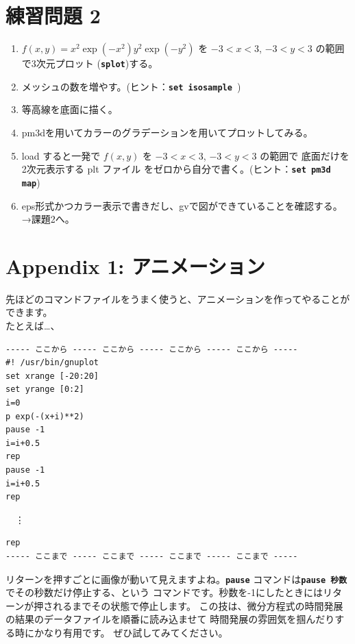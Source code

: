 \documentclass[a4j]{ujarticle} %
\begin{document}
\section{練習問題 2}
\begin{enumerate}
\item
     $f(x,y) = x^2 \exp \left(-x^2\right) y^2 \exp \left(-y^2\right)$
     を $-3<x<3$, $-3<y<3$
     の範囲で3次元プロット ({\tt\bf splot})する。
\item
     メッシュの数を増やす。(ヒント：{\tt\bf set isosample })
\item
     等高線を底面に描く。
\item
     pm3dを用いてカラーのグラデーションを用いてプロットしてみる。
\item
     load すると一発で $f(x,y)$
     を $-3<x<3$, $-3<y<3$ の範囲で
     底面だけを2次元表示する plt ファイル
     をゼロから自分で書く。(ヒント：{\tt\bf set pm3d map})
\item
     eps形式かつカラー表示で書きだし、gvで図ができていることを確認する。\\
     →課題2へ。
\end{enumerate}

\newpage
\section*{Appendix 1:  アニメーション}
先ほどのコマンドファイルをうまく使うと、アニメーションを作ってやることが
できます。\\
たとえば…、
\begin{verbatim}
----- ここから ----- ここから ----- ここから ----- ここから -----
#! /usr/bin/gnuplot
set xrange [-20:20]
set yrange [0:2]
i=0
p exp(-(x+i)**2)
pause -1
i=i+0.5
rep
pause -1
i=i+0.5
rep
\end{verbatim}
\ \ \vdots
\begin{verbatim}
rep
----- ここまで ----- ここまで ----- ここまで ----- ここまで -----
\end{verbatim}
リターンを押すごとに画像が動いて見えますよね。{\tt\bf pause}
	コマンドは{\tt\bf pause 秒数}でその秒数だけ停止する、という
	コマンドです。秒数を-1にしたときにはリターンが押されるまでその状態で停止します。
この技は、微分方程式の時間発展の結果のデータファイルを順番に読み込ませて
	時間発展の雰囲気を掴んだりする時にかなり有用です。
ぜひ試してみてください。
\end{document}
